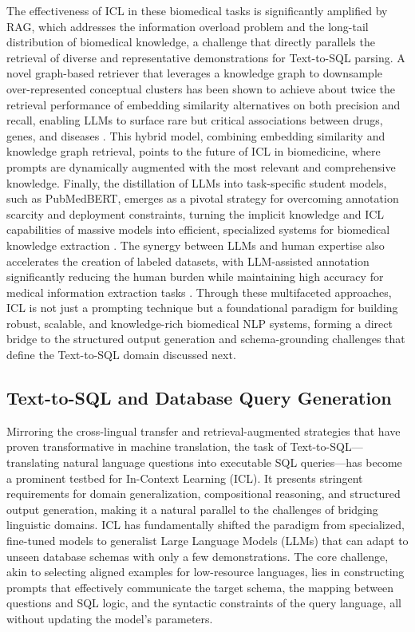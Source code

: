 \documentclass[11pt]{article}
\begin{document}
The effectiveness of ICL in these biomedical tasks is significantly amplified by RAG, which addresses the information overload problem and the long-tail distribution of biomedical knowledge, a challenge that directly parallels the retrieval of diverse and representative demonstrations for Text-to-SQL parsing. A novel graph-based retriever that leverages a knowledge graph to downsample over-represented conceptual clusters has been shown to achieve about twice the retrieval performance of embedding similarity alternatives on both precision and recall, enabling LLMs to surface rare but critical associations between drugs, genes, and diseases \cite{ref521}. This hybrid model, combining embedding similarity and knowledge graph retrieval, points to the future of ICL in biomedicine, where prompts are dynamically augmented with the most relevant and comprehensive knowledge. Finally, the distillation of LLMs into task-specific student models, such as PubMedBERT, emerges as a pivotal strategy for overcoming annotation scarcity and deployment constraints, turning the implicit knowledge and ICL capabilities of massive models into efficient, specialized systems for biomedical knowledge extraction \cite{ref515}. The synergy between LLMs and human expertise also accelerates the creation of labeled datasets, with LLM-assisted annotation significantly reducing the human burden while maintaining high accuracy for medical information extraction tasks \cite{ref522}. Through these multifaceted approaches, ICL is not just a prompting technique but a foundational paradigm for building robust, scalable, and knowledge-rich biomedical NLP systems, forming a direct bridge to the structured output generation and schema-grounding challenges that define the Text-to-SQL domain discussed next.

\subsection{Text-to-SQL and Database Query Generation}

Mirroring the cross-lingual transfer and retrieval-augmented strategies that have proven transformative in machine translation, the task of Text-to-SQL---translating natural language questions into executable SQL queries---has become a prominent testbed for In-Context Learning (ICL). It presents stringent requirements for domain generalization, compositional reasoning, and structured output generation, making it a natural parallel to the challenges of bridging linguistic domains. ICL has fundamentally shifted the paradigm from specialized, fine-tuned models to generalist Large Language Models (LLMs) that can adapt to unseen database schemas with only a few demonstrations. The core challenge, akin to selecting aligned examples for low-resource languages, lies in constructing prompts that effectively communicate the target schema, the mapping between questions and SQL logic, and the syntactic constraints of the query language, all without updating the model's parameters.
\end{document}
